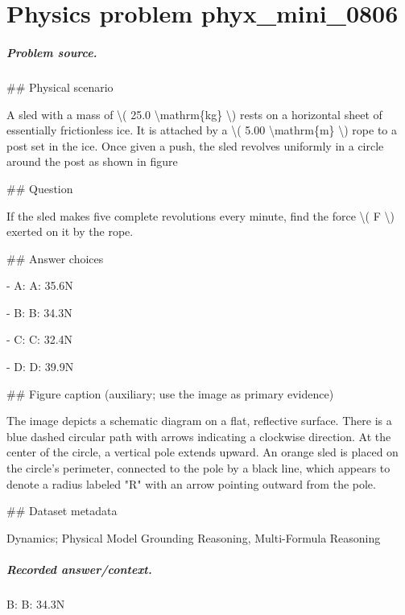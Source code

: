 
\chapter{Physics problem phyx\_mini\_0806}
\label{ch:PhyXMiniProblems_problem_phyx_mini_0806}

\paragraph{Problem source.}
\#\# Physical scenario

A sled with a mass of \textbackslash{}( 25.0 \textbackslash{}mathrm\{kg\} \textbackslash{}) rests on a horizontal sheet of essentially frictionless ice. It is attached by a \textbackslash{}( 5.00 \textbackslash{}mathrm\{m\} \textbackslash{}) rope to a post set in the ice. Once given a push, the sled revolves uniformly in a circle around the post as shown in figure

\#\# Question

If the sled makes five complete revolutions every minute, find the force \textbackslash{}( F \textbackslash{}) exerted on it by the rope.

\#\# Answer choices

- A: A: 35.6N

- B: B: 34.3N

- C: C: 32.4N

- D: D: 39.9N

\#\# Figure caption (auxiliary; use the image as primary evidence)

The image depicts a schematic diagram on a flat, reflective surface. There is a blue dashed circular path with arrows indicating a clockwise direction. At the center of the circle, a vertical pole extends upward. An orange sled is placed on the circle's perimeter, connected to the pole by a black line, which appears to denote a radius labeled "R" with an arrow pointing outward from the pole.

\#\# Dataset metadata

Dynamics; Physical Model Grounding Reasoning, Multi-Formula Reasoning

\paragraph{Recorded answer/context.}
B: B: 34.3N

